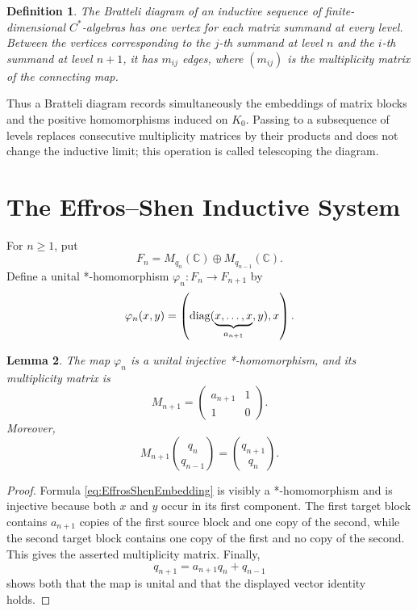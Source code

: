 \documentclass{book}
\newtheorem{definition}{Definition}[section]
\newtheorem{lemma}[definition]{Lemma}
\def\diag{\textnormal{diag}}
\begin{document}
\begin{definition}
  The \textnormal{Bratteli diagram} of an inductive sequence of
  finite-dimensional \(C^*\)-algebras has one vertex for each matrix
  summand at every level.  Between the vertices corresponding to the
  \(j\)-th summand at level \(n\) and the \(i\)-th summand at level \(n+1\),
  it has \(m_{ij}\) edges, where \((m_{ij})\) is the multiplicity matrix of
  the connecting map.
\end{definition}

Thus a Bratteli diagram records simultaneously the embeddings of matrix
blocks and the positive homomorphisms induced on \(K_0\).  Passing to a
subsequence of levels replaces consecutive multiplicity matrices by their
products and does not change the inductive limit; this operation is called
\textnormal{telescoping} the diagram.

\section{The Effros--Shen Inductive System}

For \(n\geq1\), put
\[
  F_n=M_{q_n}(\mathbb C)\oplus M_{q_{n-1}}(\mathbb C).
\]
Define a unital *-homomorphism \(\varphi_n\colon F_n\to F_{n+1}\) by
\begin{equation}\label{eq:EffrosShenEmbedding}
  \varphi_n(x,y)=
  \left(
    \diag(\underbrace{x,\ldots,x}_{a_{n+1}},y),x
  \right).
\end{equation}

\begin{lemma}\label{lemma:EffrosShenMultiplicity}
  The map \(\varphi_n\) is a unital injective *-homomorphism, and its
  multiplicity matrix is
  \[
    M_{n+1}=
    \begin{pmatrix}a_{n+1}&1\\1&0\end{pmatrix}.
  \]
  Moreover,
  \[
    M_{n+1}\binom{q_n}{q_{n-1}}
      =\binom{q_{n+1}}{q_n}.
  \]
\end{lemma}

\begin{proof}
  Formula \eqref{eq:EffrosShenEmbedding} is visibly a *-homomorphism and is
  injective because both \(x\) and \(y\) occur in its first component.  The
  first target block contains \(a_{n+1}\) copies of the first source block
  and one copy of the second, while the second target block contains one
  copy of the first and no copy of the second.  This gives the asserted
  multiplicity matrix.  Finally,
  \[
    q_{n+1}=a_{n+1}q_n+q_{n-1}
  \]
  shows both that the map is unital and that the displayed vector identity
  holds.
\end{proof}
\end{document}
